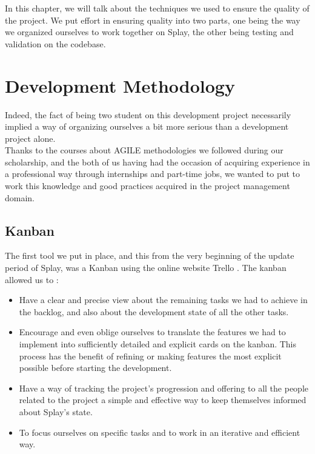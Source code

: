 \documentclass{eplmastersthesis}
\begin{document}
    In this chapter, we will talk about the techniques we used to ensure the
    quality of the project. We put effort in ensuring quality into two
    parts, one being the way we organized ourselves to work together on Splay,
    the other being testing and validation on the codebase.

    \section{Development Methodology}

      Indeed, the fact of being two student on this development project necessarily
      implied a way of organizing ourselves a bit more serious than a
      development project alone.\\

      Thanks to the courses about AGILE methodologies we followed during our
      scholarship, and the both of us having had the occasion of acquiring
      experience in a professional way through internships and part-time jobs,
      we wanted to put to work this knowledge and good practices acquired in
      the project management domain.

        \subsection{Kanban}

          The first tool we put in place, and this from the very beginning of
          the update period of Splay, was a Kanban using the online website
          Trello \cite{trello}. The kanban allowed us to : \\

          \begin{itemize}
            \item Have a clear and precise view about the remaining tasks we had
            to achieve in the backlog, and also about the development state of
            all the other tasks.
            \item Encourage and even oblige ourselves to translate the features
            we had to implement into sufficiently detailed and explicit cards on
            the kanban. This process has the benefit of refining or making
            features the most explicit possible before starting the development.
            \item Have a way of tracking the project's progression and offering
            to all the people related to the project a simple and effective way
            to keep themselves informed about Splay's state.
            \item To focus ourselves on specific tasks and to work in an
            iterative and efficient way.
          \end{itemize}
\end{document}
